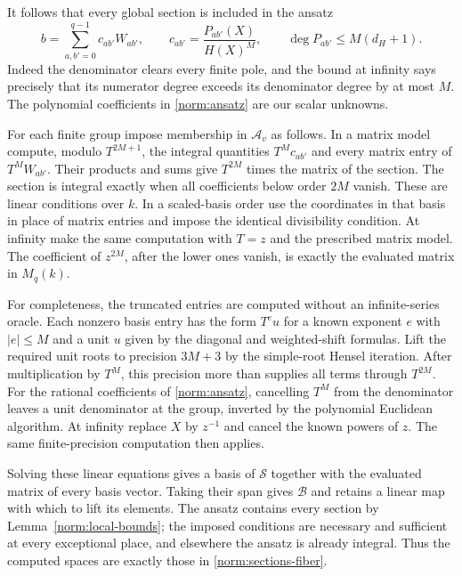 It follows that every global section is included in the ansatz
\begin{equation}\label{norm:ansatz}
 b=\sum_{a,b'=0}^{q-1}c_{ab'}W_{ab'},\qquad
 c_{ab'}=\frac{P_{ab'}(X)}{H(X)^M},\qquad
 \deg P_{ab'}\le M(d_H+1).
\end{equation}
Indeed the denominator clears every finite pole, and the bound at
infinity says precisely that its numerator degree exceeds its
denominator degree by at most $M$.  The polynomial coefficients in
\eqref{norm:ansatz} are our scalar unknowns.

For each finite group impose membership in $\mathcal A_v$ as follows.
In a matrix model compute, modulo $T^{2M+1}$, the integral quantities
$T^M c_{ab'}$ and every matrix entry of $T^M W_{ab'}$.
Their products and sums give $T^{2M}$ times the matrix of the section.
The section is integral exactly when all coefficients below order
$2M$ vanish.  These are linear conditions over $k$.  In a
scaled-basis order use the coordinates in that basis in place of
matrix entries and impose the identical divisibility condition.
At infinity make the same computation with $T=z$ and the prescribed
matrix model.  The coefficient of $z^{2M}$, after the lower ones
vanish, is exactly the evaluated matrix in $M_q(k)$.

For completeness, the truncated entries are computed without an
infinite-series oracle.  Each nonzero basis entry has the form
$T^e u$ for a known exponent $e$ with $|e|\le M$ and a unit $u$ given
by the diagonal and weighted-shift formulas.  Lift the required unit
roots to precision $3M+3$ by the simple-root Hensel iteration.  After
multiplication by $T^M$, this precision more than supplies all terms
through $T^{2M}$.  For the rational coefficients of
\eqref{norm:ansatz}, cancelling $T^M$ from the denominator leaves a
unit denominator at the group, inverted by the polynomial Euclidean
algorithm.  At infinity replace $X$ by $z^{-1}$ and cancel the known
powers of $z$.  The same finite-precision computation then applies.

Solving these linear equations gives a basis of $\mathcal S$ together
with the evaluated matrix of every basis vector.  Taking their span
gives $\mathcal B$ and retains a linear map with which to lift its
elements.  The ansatz contains every section by
Lemma~\ref{norm:local-bounds}; the imposed conditions are necessary
and sufficient at every exceptional place, and elsewhere the ansatz
is already integral.  Thus the computed spaces are exactly those in
\eqref{norm:sections-fiber}.

